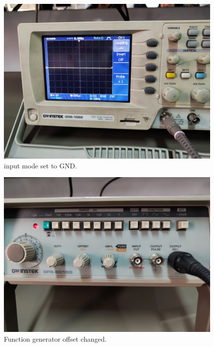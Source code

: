 \documentclass[11pt]{article}
\newcommand{\PicScale}{0.2}
\begin{document}
\begin{question}
{        \begin{figure}[H]
            \begin{center}
                \includegraphics[scale=\PicScale]{Fig/16.jpeg}
                \caption{input mode set to GND.}
            \end{center}
        \end{figure}

        \begin{figure}[H]
            \begin{center}
                \includegraphics[scale=\PicScale]{Fig/17.jpeg}
                \caption{Function generator offset changed.}
            \end{center}
        \end{figure}

    }

\end{question}
\end{document}

